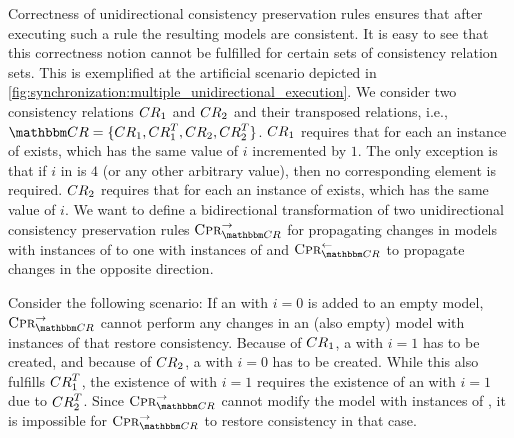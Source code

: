 Correctness of unidirectional consistency preservation rules ensures that after executing such a rule the resulting models are consistent.
It is easy to see that this correctness notion cannot be fulfilled for certain sets of consistency relation sets.
This is exemplified at the artificial scenario depicted in \autoref{fig:synchronization:multiple_unidirectional_execution}.
We consider two consistency relations $\consistencyrelation{CR}{1}$ and $\consistencyrelation{CR}{2}$ and their transposed relations, i.e., $\consistencyrelationset{CR} = \setted{\consistencyrelation{CR}{1}, \consistencyrelation{CR}{1}^T, \consistencyrelation{CR}{2}, \consistencyrelation{CR}{2}^T}$.
$\consistencyrelation{CR}{1}$ requires that for each  an instance of  exists, which has the same value of $i$ incremented by $1$.
The only exception is that if $i$ in  is $4$ (or any other arbitrary value), then no corresponding element  is required.
$\consistencyrelation{CR}{2}$ requires that for each  an instance of  exists, which has the same value of $i$.
We want to define a bidirectional transformation of two unidirectional consistency preservation rules $\consistencypreservationrule{\consistencyrelationset{CR}}^{\rightarrow}$ for propagating changes in models with instances of  to one with instances of  and $\consistencypreservationrule{\consistencyrelationset{CR}}^{\leftarrow}$ to propagate changes in the opposite direction. 

Consider the following scenario: If an  with $i = 0$ is added to an empty model, $\consistencypreservationrule{\consistencyrelationset{CR}}^{\rightarrow}$ cannot perform any changes in an (also empty) model with instances of  that restore consistency.
Because of $\consistencyrelation{CR}{1}$, a  with $i = 1$ has to be created, and because of $\consistencyrelation{CR}{2}$, a  with $i = 0$ has to be created.
While this also fulfills $\consistencyrelation{CR}{1}^T$, the existence of  with $i = 1$ requires the existence of an  with $i = 1$ due to $\consistencyrelation{CR}{2}^T$.
Since $\consistencypreservationrule{\consistencyrelationset{CR}}^{\rightarrow}$ cannot modify the model with instances of , it is impossible for $\consistencypreservationrule{\consistencyrelationset{CR}}^{\rightarrow}$ to restore consistency in that case.

